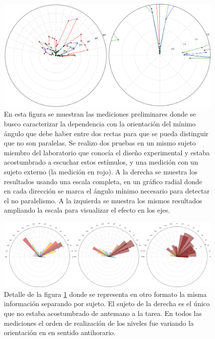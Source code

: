 \documentclass{article}
\begin{document}
    \begin{figure}
        \center
        \includegraphics[width=\textwidth]{Imagenes/Umbral.png}
        \caption{En esta figura se muestran las mediciones preliminares donde se busco caracterizar la dependencia con la orientación del mínimo ángulo que debe haber entre dos rectas para que se pueda distinguir que no son paralelas. Se realizo dos pruebas en un mismo sujeto miembro del laboratorio que conocía el diseño experimental y estaba acostumbrado a escuchar estos estímulos, y una medición con un sujeto externo (la medición en rojo). A la derecha se muestra los resultados usando una escala completa, en un gráfico radial donde en cada dirección se marca el ángulo mínimo necesario para detectar el no paralelismo. A la izquierda se muestra los mismos resultados ampliando la escala para visualizar el efecto en los ejes.}
        \label{fig:Umbral}
    \end{figure}  
    
    
          
    \begin{figure}
        \center
        \includegraphics[width=\textwidth]{Imagenes/UmbralDetalle.png}
        \caption{Detalle de la figura \ref{fig:Umbral} donde se representa en otro formato la misma información separando por sujeto. El sujeto de la derecha es el único que no estaba acostumbrado de antemano a la tarea. En todos las mediciones el orden de realización de los niveles fue variando la orientación en en sentido antihorario.}
        \label{fig:UmbralDetalle}
    \end{figure}  
    
\end{document}
